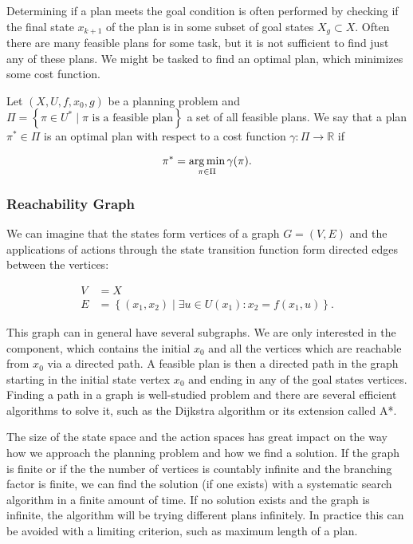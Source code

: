 Determining if a plan meets the goal condition is often performed by checking if the final state $x_{k+1}$ of the plan is in some subset of goal states $X_g\subset X$. Often there are many feasible plans for some task, but it is not sufficient to find just any of these plans. We might be tasked to find an optimal plan, which minimizes some cost function.

\begin{defn}
	Let $\left(X, U, f, x_0, g\right)$ be a planning problem and $\Pi=\left\{\pi\in U^* \mid \pi \text{ is a feasible plan}\right\}$ a set of all feasible plans. We say that a plan $\pi^*\in \Pi$ is an optimal plan with respect to a cost function $\gamma: \Pi \rightarrow \mathbb{R}$ if
	
	\[
		\pi^*=\operatorname*{arg\,min}_{\pi\in\Pi} \gamma(\pi).
	\]
\end{defn}

\subsubsection{Reachability Graph}

We can imagine that the states form vertices of a graph $G=(V, E)$ and the applications of actions through the state transition function form directed edges between the vertices:

\begin{equation*}
\begin{aligned}
	V&=X \\
	E&=\left\{(x_1, x_2) \mid \exists u \in U(x_1): x_2 = f(x_1, u) \right\}.
\end{aligned}
\end{equation*}

This graph can in general have several subgraphs. We are only interested in the component, which contains the initial $x_0$ and all the vertices which are reachable from $x_0$ via a directed path. A feasible plan is then a directed path in the graph starting in the initial state vertex $x_0$ and ending in any of the goal states vertices. Finding a path in a graph is well-studied problem and there are several efficient algorithms to solve it, such as the Dijkstra algorithm or its extension called A*.

The size of the state space and the action spaces has great impact on the way how we approach the planning problem and how we find a solution. If the graph is finite or if the the number of vertices is countably infinite and the branching factor is finite, we can find the solution (if one exists) with a systematic search algorithm in a finite amount of time. If no solution exists and the graph is infinite, the algorithm will be trying different plans infinitely. In practice this can be avoided with a limiting criterion, such as maximum length of a plan.

